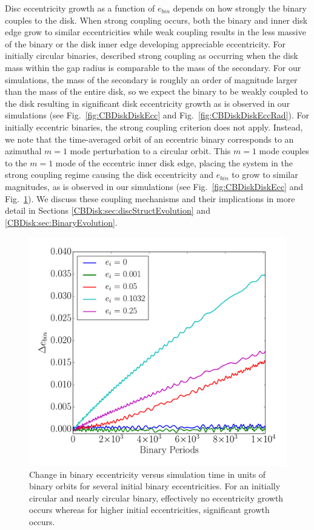 Disc eccentricity growth as a function of $e_{bin}$ depends on how strongly the binary couples to the disk.  When strong coupling occurs, both the binary and inner disk edge grow to similar eccentricities while weak coupling results in the less massive of the binary or the disk inner edge developing appreciable eccentricity.  For initially circular binaries, \citet{Papaloizou2001} described strong coupling as occurring when the disk mass within the gap radius is comparable to the mass of the secondary.  For our simulations, the mass of the secondary is roughly an order of magnitude larger than the mass of the entire disk, so we expect the binary to be weakly coupled to the disk resulting in significant disk eccentricity growth as is observed in our simulations (see Fig.~\ref{fig:CBDiskDiskEcc} and Fig.~\ref{fig:CBDiskDiskEccRad}).  For initially eccentric binaries, the \citet{Papaloizou2001} strong coupling criterion does not apply.  Instead, we note that the time-averaged orbit of an eccentric binary corresponds to an azimuthal $m = 1$ mode perturbation to a circular orbit.  This $m = 1$ mode couples to the $m = 1$ mode of the eccentric inner disk edge, placing the system in the strong coupling regime causing the disk eccentricity and $e_{bin}$ to grow to similar magnitudes, as is observed in our simulations (see Fig.~\ref{fig:CBDiskDiskEcc} and Fig.~\ref{fig:CBDiskBinEcc}).  We discuss these coupling mechanisms and their implications in more detail in Sections \ref{CBDisk:sec:discStructEvolution} and \ref{CBDisk:sec:BinaryEvolution}.

\begin{figure}
	\includegraphics[width=\columnwidth]{f4}
    \caption{Change in binary eccentricity versus simulation time in units of binary orbits for several initial
binary eccentricities. For an initially circular and nearly circular binary, effectively no eccentricity growth occurs whereas 
for higher initial eccentricities, significant growth occurs.}
    \label{fig:CBDiskBinEcc}
\end{figure}

